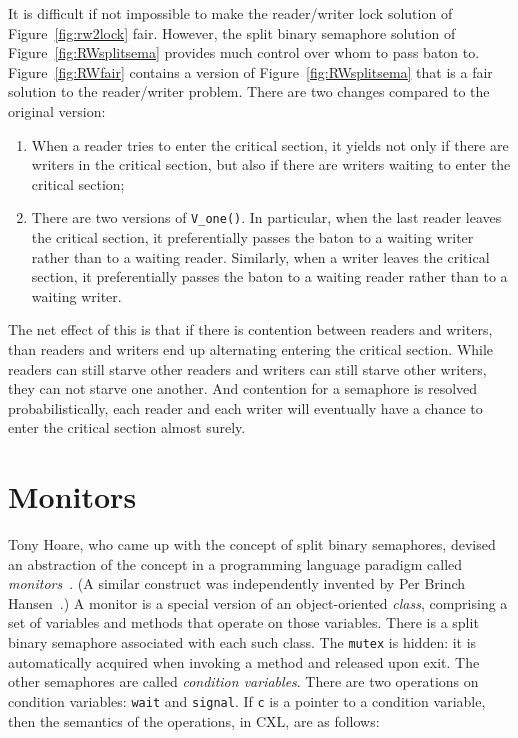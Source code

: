 \documentclass{report}
\begin{document}
It is difficult if not impossible to make the reader/writer lock solution of
Figure~\ref{fig:rw2lock} fair.  However, the split binary semaphore solution of
Figure~\ref{fig:RWsplitsema} provides much control over whom to pass baton
to.
Figure~\ref{fig:RWfair} contains a version of Figure~\ref{fig:RWsplitsema}
that is a fair solution to the reader/writer problem.  There are two changes
compared to the original version:

\begin{enumerate}
\item When a reader tries to enter the critical section, it yields not only
if there are writers in the critical section, but also if there are writers
waiting to enter the critical section;
\item There are two versions of \texttt{V\_one()}.  In particular, when the
last reader leaves the critical section, it preferentially passes the baton
to a waiting writer rather than to a waiting reader.  Similarly,
when a writer leaves the critical section, it preferentially passes
the baton to a waiting reader rather than to a waiting writer.
\end{enumerate}

The net effect of this is that if there is contention between readers and
writers, than readers and writers end up alternating entering the critical
section.  While readers can still starve other readers and writers can still
starve other writers, they can not starve one another.  And contention for
a semaphore is resolved probabilistically, each reader and each writer will
eventually have a chance to enter the critical section almost surely.

\chapter{Monitors}
\label{ch:monitors}

Tony Hoare, who came up with the concept of split binary semaphores, devised
an abstraction of the concept in a programming language paradigm called
\emph{monitors}~\cite{Hoare74}.
(A similar construct was independently invented by Per Brinch Hansen~\cite{BH73}.)
A monitor is a special version of an object-oriented \emph{class}, comprising
a set of variables and methods that operate on those variables.
There is a split binary semaphore associated with each such class.
The \texttt{mutex} is hidden: it is automatically acquired when invoking a
method and released upon exit.
The other semaphores are called \emph{condition variables}.
There are two operations on condition variables: \texttt{wait}
and
\texttt{signal}.
If \texttt{c} is a pointer to a condition variable, then the semantics of the
operations, in CXL, are as follows:
\end{document}
